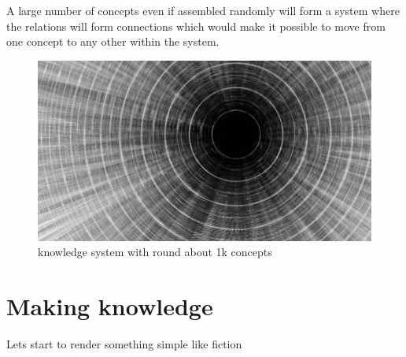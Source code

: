 \documentclass[11pt]{article}
\begin{document}
A large number of concepts even if assembled randomly 
will form a system where the relations will form connections 
which would make it possible to move from one concept to any other within 
the system.


\begin{figure}[htp]
\centering
\includegraphics[scale=0.25]{img/1362924302_directories.png}
\caption{knowledge system with round about 1k concepts}
\label{every thought is interlocked somewhere at some point}
\end{figure}





\section{Making knowledge}
Lets start to render something simple like 
fiction
\end{document}
